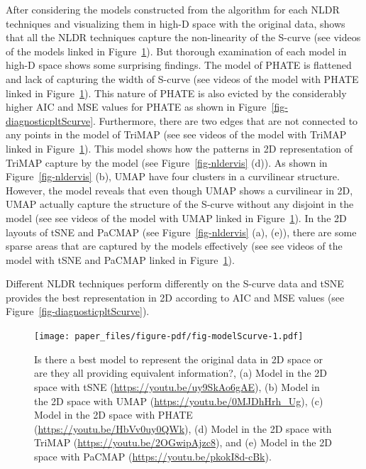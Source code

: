\documentclass[
  12pt]{article}
\begin{document}
After considering the models constructed from the algorithm for each
NLDR techniques and visualizing them in high-D space with the original
data, shows that all the NLDR techniques capture the non-linearity of
the S-curve (see videos of the models linked in
Figure~\ref{fig-modelScurve}). But thorough examination of each model in
high-D space shows some surprising findings. The model of PHATE is
flattened and lack of capturing the width of S-curve (see videos of the
model with PHATE linked in Figure~\ref{fig-modelScurve}). This nature of
PHATE is also evicted by the considerably higher AIC and MSE values for
PHATE as shown in Figure~\ref{fig-diagnosticpltScurve}. Furthermore,
there are two edges that are not connected to any points in the model of
TriMAP (see see videos of the model with TriMAP linked in
Figure~\ref{fig-modelScurve}). This model shows how the patterns in 2D
representation of TriMAP capture by the model (see
Figure~\ref{fig-nldervis} (d)). As shown in Figure~\ref{fig-nldervis}
(b), UMAP have four clusters in a curvilinear structure. However, the
model reveals that even though UMAP shows a curvilinear in 2D, UMAP
actually capture the structure of the S-curve without any disjoint in
the model (see see videos of the model with UMAP linked in
Figure~\ref{fig-modelScurve}). In the 2D layouts of tSNE and PaCMAP (see
Figure~\ref{fig-nldervis} (a), (e)), there are some sparse areas that
are captured by the models effectively (see see videos of the model with
tSNE and PaCMAP linked in Figure~\ref{fig-modelScurve}).

Different NLDR techniques perform differently on the S-curve data and
tSNE provides the best representation in 2D according to AIC and MSE
values (see Figure~\ref{fig-diagnosticpltScurve}).

\begin{figure}

{\centering \texttt{[image: paper\_files/figure-pdf/fig-modelScurve-1.pdf]}

}

\caption{\label{fig-modelScurve}Is there a best model to represent the
original data in 2D space or are they all providing equivalent
information?, (a) Model in the 2D space with tSNE
(\url{https://youtu.be/uy9SkAo6gAE}), (b) Model in the 2D space with
UMAP (\url{https://youtu.be/0MJDhHrh_Ug}), (c) Model in the 2D space
with PHATE (\url{https://youtu.be/HbVv0uy0QWk}), (d) Model in the 2D
space with TriMAP (\url{https://youtu.be/2OGwipAjzc8}), and (e) Model in
the 2D space with PaCMAP (\url{https://youtu.be/pkokI8d-cBk}).}

\end{figure}
\end{document}
